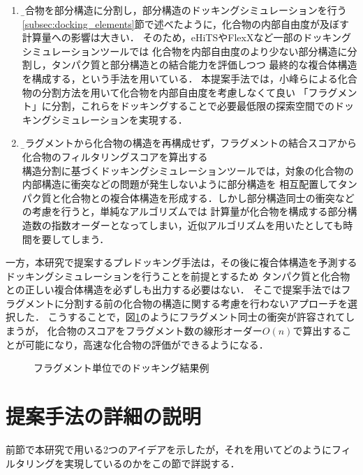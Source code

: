 \begin{enumerate}
\item \b{化合物を部分構造に分割し，部分構造のドッキングシミュレーションを行う}\\
\ref{subsec:docking_elements}節で述べたように，化合物の内部自由度が及ぼす計算量への影響は大きい．
そのため，eHiTS\cite{Zsoldos2007}やFlexX\cite{Rarey1996}など一部のドッキングシミュレーションツールでは
化合物を内部自由度のより少ない部分構造に分割し，タンパク質と部分構造との結合能力を評価しつつ
最終的な複合体構造を構成する，という手法を用いている．
本提案手法では，小峰ら\cite{Shunta2015}による化合物の分割方法を用いて化合物を内部自由度を考慮しなくて良い
「フラグメント」に分割，これらをドッキングすることで必要最低限の探索空間でのドッキングシミュレーションを実現する．

\item \b{フラグメントから化合物の構造を再構成せず，フラグメントの結合スコアから化合物のフィルタリングスコアを算出する}\\
構造分割に基づくドッキングシミュレーションツールでは，対象の化合物の内部構造に衝突などの問題が発生しないように部分構造を
相互配置してタンパク質と化合物との複合体構造を形成する．しかし部分構造同士の衝突などの考慮を行うと，単純なアルゴリズムでは
計算量が化合物を構成する部分構造数の指数オーダーとなってしまい，近似アルゴリズムを用いたとしても時間を要してしまう．
\end{enumerate}

一方，本研究で提案するプレドッキング手法は，その後に複合体構造を予測するドッキングシミュレーションを行うことを前提とするため
タンパク質と化合物との正しい複合体構造を必ずしも出力する必要はない．
そこで提案手法ではフラグメントに分割する前の化合物の構造に関する考慮を行わないアプローチを選択した．
こうすることで，図\ref{fig:divided_fragment}のようにフラグメント同士の衝突が許容されてしまうが，
化合物のスコアをフラグメント数の線形オーダー$O(n)$で算出することが可能になり，高速な化合物の評価ができるようになる．

\begin{figure}[t]
 \begin{center}
  \caption{フラグメント単位でのドッキング結果例}
  \label{fig:divided_fragment}
 \end{center}
\end{figure}



\section{提案手法の詳細の説明}
前節で本研究で用いる2つのアイデアを示したが，それを用いてどのようにフィルタリングを実現しているのかをこの節で詳説する．

